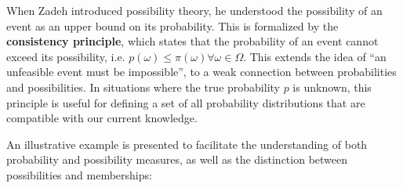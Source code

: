 When Zadeh introduced possibility theory, he understood the possibility of an event as an upper bound on its probability. This is formalized by the \textbf{consistency principle}, which states that the probability of an event cannot exceed its possibility, i.e. $p(\omega) \leq \pi(\omega) \forall \omega \in \Omega$. This extends the idea of ``an unfeasible event must be impossible'', to a weak connection between probabilities and possibilities. In situations where the true probability $p$ is unknown, this principle is useful for defining a set of all probability distributions that are compatible with our current knowledge. 

An illustrative example is presented to facilitate the understanding of both probability and possibility measures, as well as the distinction between possibilities and memberships:


